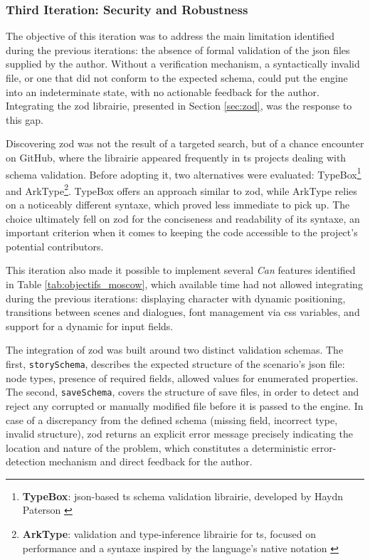 \subsubsection{Third Iteration: Security and Robustness}


The objective of this iteration was to address the main limitation identified during the previous iterations: the absence of formal validation of the \acrshort{json} files supplied by the author. Without a verification mechanism, a syntactically invalid file, or one that did not conform to the expected \gls{schema}, could put the engine into an indeterminate state, with no actionable feedback for the author. Integrating the \gls{zod} \gls{librairie}, presented in Section \ref{sec:zod}, was the response to this gap.

Discovering \gls{zod} was not the result of a targeted search, but of a chance encounter on GitHub, where the \gls{librairie} appeared frequently in \gls{ts} projects dealing with \gls{schema} validation. Before adopting it, two alternatives were evaluated: TypeBox\footnote{\textbf{TypeBox}: \gls{json}-based \gls{ts} \gls{schema} validation \gls{librairie}, developed by Haydn Paterson \parencite{noauthor_typebox_nodate}} and ArkType\footnote{\textbf{ArkType}: validation and type-inference \gls{librairie} for \gls{ts}, focused on performance and a \gls{syntaxe} inspired by the language's native notation \parencite{noauthor_arktype_nodate}}. TypeBox offers an approach similar to \gls{zod}, while ArkType relies on a noticeably different \gls{syntaxe}, which proved less immediate to pick up. The choice ultimately fell on \gls{zod} for the conciseness and readability of its \gls{syntaxe}, an important criterion when it comes to keeping the code accessible to the project's potential contributors.

\clearpage

This iteration also made it possible to implement several \textit{Can} features identified in Table \ref{tab:objectifs_moscow}, which available time had not allowed integrating during the previous iterations: displaying character  with dynamic positioning, transitions between scenes and dialogues, font management via \acrshort{css} variables, and support for a dynamic  for input fields.



The integration of \gls{zod} was built around two distinct validation \glspl{schema}. The first, \texttt{storySchema}, describes the expected structure of the scenario's \acrshort{json} file: node types, presence of required fields, allowed values for enumerated properties. The second, \texttt{saveSchema}, covers the structure of save files, in order to detect and reject any corrupted or manually modified file before it is passed to the engine. In case of a discrepancy from the defined \gls{schema} (missing field, incorrect type, invalid structure), \gls{zod} returns an explicit error message precisely indicating the location and nature of the problem, which constitutes a deterministic error-detection mechanism and direct feedback for the author.

